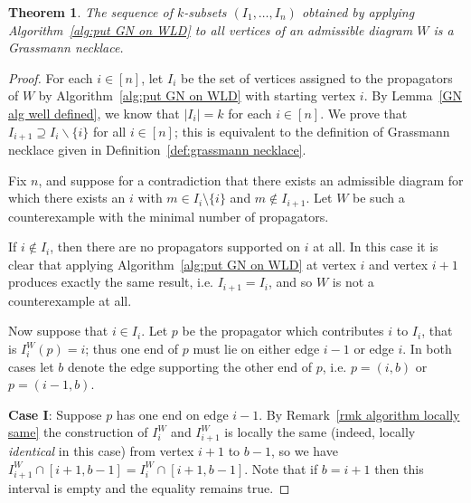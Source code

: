 \documentclass[11pt]{article}
\newcommand{\note}{\todo[color=green!40]}
\def\bas #1\eas{\begin{align*} #1 \end{align*}}
\newtheorem{thm}{Theorem}[section]
\theoremstyle{remark}
\theoremstyle{definition}
\begin{document}
\begin{thm}\label{res:alg gives GN}
The sequence of $k$-subsets $(I_1,\dots,I_n)$ obtained by applying Algorithm~\ref{alg:put GN on WLD} to all vertices of an admissible diagram $W$ is a Grassmann necklace.
\end{thm}
\begin{proof}
For each $i \in [n]$, let $I_i$ be the set of vertices assigned to the propagators of $W$ by Algorithm~\ref{alg:put GN on WLD} with starting vertex $i$. By Lemma~\ref{GN alg well defined}, we know that $|I_i| = k$ for each $i \in [n]$. We prove that $I_{i+1} \supseteq I_i \backslash \{i\}$ for all $i \in [n]$; this is equivalent to the definition of Grassmann necklace given in Definition~\ref{def:grassmann necklace}.

Fix $n$, and suppose for a contradiction that there exists an admissible diagram for which there exists an $i$ with $m\in I_i\setminus \{i\}$ and $m \not\in I_{i+1}$.  Let $W$ be such a counterexample with the minimal number of propagators.

If $i \not\in I_i$, then there are no propagators supported on $i$ at all.  In this case it is clear that applying Algorithm~\ref{alg:put GN on WLD} at vertex $i$ and vertex $i+1$ produces exactly the same result, i.e. $I_{i+1} = I_i$, and so $W$ is not a counterexample at all.

Now suppose that $i \in I_i$.  Let $p$ be the propagator which contributes $i$ to $I_i$, that is $I^W_i(p) = i$; thus one end of $p$ must lie on either edge $i-1$ or edge $i$.  In both cases let $b$ denote the edge supporting the other end of $p$, i.e. $p = (i, b)$ or $p = (i-1, b)$.


\textbf{Case I}:  Suppose $p$ has one end on edge $i-1$. By Remark~\ref{rmk algorithm locally same} the construction of $I_i^W$ and $I_{i+1}^W$ is locally the same (indeed, locally {\em identical} in this case) from vertex $i+1$ to $b-1$, so we have $I_{i+1}^W \cap [i+1,b-1] = I_{i}^W \cap [i+1,b-1]$. Note that if $b = i+1$ then this interval is empty and the equality remains true.



\end{proof}
\end{document}
